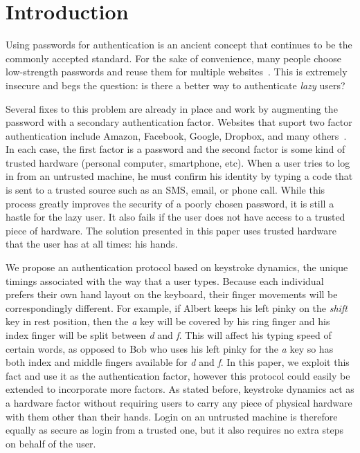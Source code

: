 \documentclass[11pt]{article}
\begin{document}
\section{Introduction}
Using passwords for authentication is an ancient concept that continues to be the commonly accepted standard. For the sake of convenience, many people choose low-strength passwords and reuse them for multiple websites~\cite{Florencio:2007:LSW:1242572.1242661}. This is extremely insecure and begs the question: is there a better way to authenticate \textit{lazy} users?

Several fixes to this problem are already in place and work by augmenting the password with a secondary authentication factor. Websites that suport two factor authentication include Amazon, Facebook, Google, Dropbox, and many others~\cite{2fac}. In each case, the first factor is a password and the second factor is some kind of trusted hardware (personal computer, smartphone, etc). When a user tries to log in from an untrusted machine, he must confirm his identity by typing a code that is sent to a trusted source such as an SMS, email, or phone call. While this process greatly improves the security of a poorly chosen password, it is still a hastle for the lazy user. It also fails if the user does not have access to a trusted piece of hardware. The solution presented in this paper uses trusted hardware that the user has at all times: his hands.

We propose an authentication protocol based on keystroke dynamics, the unique timings associated with the way that a user types.  Because each individual prefers their own hand layout on the keyboard, their finger movements will be correspondingly different.  For example, if Albert keeps his left pinky on the \textit{shift} key in rest position, then the \textit{a} key will be covered by his ring finger and his index finger will be split between \textit{d} and \textit{f}.  This will affect his typing speed of certain words, as opposed to Bob who uses his left pinky for the \textit{a} key so has both index and middle fingers available for \textit{d} and \textit{f}.  In this paper, we exploit this fact and use it as the authentication factor, however this protocol could easily be extended to incorporate more factors. As stated before, keystroke dynamics act as a hardware factor without requiring users to carry any piece of physical hardware with them other than their hands. Login on an untrusted machine is therefore equally as secure as login from a trusted one, but it also requires no extra steps on behalf of the user.
\end{document}

